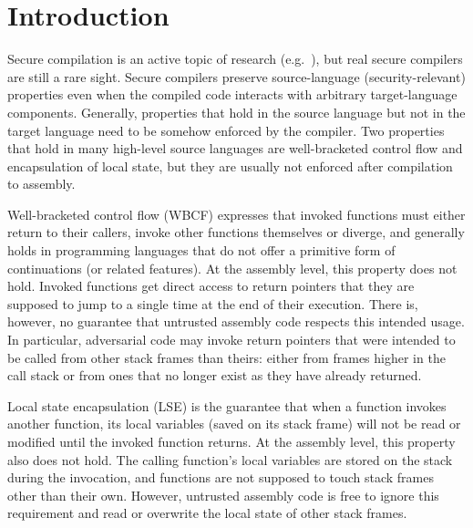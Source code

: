 \documentclass{jfp}
\begin{document}
\renewcommand\lau[1]{}
\renewcommand\dominique[1]{}
\renewcommand\lars[1]{}


\section{Introduction}
\label{sec:introduction}
Secure compilation is an active topic of research (e.g.~\citep{devriese_modular_2017,patrignani_hyper_2017,Abate:2018:GCG:3243734.3243745,new_universal_embedding_2016,juglaret_beyond_2016, patrignani_2019,barthe_formal_2019}), but real secure compilers are still a rare sight.
Secure compilers preserve source-language (security-relevant) properties even when the compiled code interacts with arbitrary target-language components.
Generally, properties that hold in the source language but not in the target language need to be somehow enforced by the compiler.
Two properties that hold in many high-level source languages are well-bracketed control flow and encapsulation of local state, but they are usually not enforced after compilation to assembly.

Well-bracketed control flow (WBCF) expresses that invoked functions must either return to their callers, invoke other functions themselves or diverge, and generally holds in programming languages that do not offer a primitive form of continuations (or related features). 
At the assembly level, this property does not hold. 
Invoked functions get direct access to return pointers that they are supposed to jump to a single time at the end of their execution.
There is, however, no guarantee that untrusted assembly code respects this intended usage.
In particular, adversarial code may invoke return pointers that were intended to be called from other stack frames than theirs: either from frames higher in the call stack or from ones that no longer exist as they have already returned. 

Local state encapsulation (LSE) is the guarantee that when a function invokes another function, its local variables (saved on its stack frame) will not be read or modified until the invoked function returns.
At the assembly level, this property also does not hold.
The calling function's local variables are stored on the stack during the invocation, and functions are not supposed to touch stack frames other than their own.
However, untrusted assembly code is free to ignore this requirement and read or overwrite the local state of other stack frames.
\end{document}
